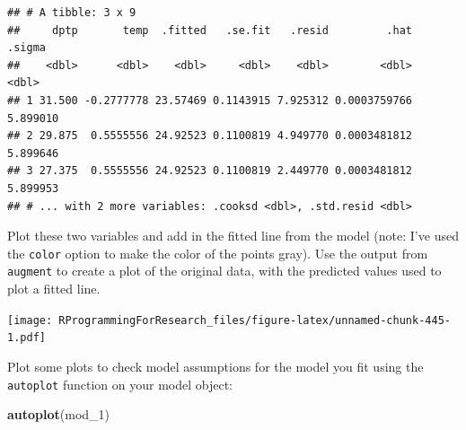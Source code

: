 \documentclass[]{book}
\makeatletter
\newenvironment{Shaded}{\begin{snugshade}}{\end{snugshade}}
\newcommand{\KeywordTok}[1]{\textcolor[rgb]{0.13,0.29,0.53}{\textbf{#1}}}
\newcommand{\DataTypeTok}[1]{\textcolor[rgb]{0.13,0.29,0.53}{#1}}
\newcommand{\DecValTok}[1]{\textcolor[rgb]{0.00,0.00,0.81}{#1}}
\newcommand{\FloatTok}[1]{\textcolor[rgb]{0.00,0.00,0.81}{#1}}
\newcommand{\StringTok}[1]{\textcolor[rgb]{0.31,0.60,0.02}{#1}}
\newcommand{\OperatorTok}[1]{\textcolor[rgb]{0.81,0.36,0.00}{\textbf{#1}}}
\newcommand{\NormalTok}[1]{#1}
\newenvironment{kframe}{%
\medskip{}
\setlength{\fboxsep}{.8em}
 \def\at@end@of@kframe{}%
 \ifinner\ifhmode%
  \def\at@end@of@kframe{\end{minipage}}%
  \begin{minipage}{\columnwidth}%
 \fi\fi%
 \def\FrameCommand##1{\hskip\@totalleftmargin \hskip-\fboxsep
 \colorbox{shadecolor}{##1}\hskip-\fboxsep
     \hskip-\linewidth \hskip-\@totalleftmargin \hskip\columnwidth}%
 \MakeFramed {\advance\hsize-\width
   \@totalleftmargin\z@ \linewidth\hsize
   \@setminipage}}%
 {\par\unskip\endMakeFramed%
 \at@end@of@kframe}
\renewenvironment{Shaded}{\begin{kframe}}{\end{kframe}}
\theoremstyle{definition}
\theoremstyle{definition}
\theoremstyle{definition}
\theoremstyle{remark}
\makeatother
\begin{document}
\begin{verbatim}
## # A tibble: 3 x 9
##     dptp       temp  .fitted   .se.fit   .resid         .hat   .sigma
##    <dbl>      <dbl>    <dbl>     <dbl>    <dbl>        <dbl>    <dbl>
## 1 31.500 -0.2777778 23.57469 0.1143915 7.925312 0.0003759766 5.899010
## 2 29.875  0.5555556 24.92523 0.1100819 4.949770 0.0003481812 5.899646
## 3 27.375  0.5555556 24.92523 0.1100819 2.449770 0.0003481812 5.899953
## # ... with 2 more variables: .cooksd <dbl>, .std.resid <dbl>
\end{verbatim}

Plot these two variables and add in the fitted line from the model
(note: I've used the \texttt{color} option to make the color of the
points gray). Use the output from \texttt{augment} to create a plot of
the original data, with the predicted values used to plot a fitted line.

\begin{Shaded}
\end{Shaded}

\texttt{[image: RProgrammingForResearch\_files/figure-latex/unnamed-chunk-445-1.pdf]}

Plot some plots to check model assumptions for the model you fit using
the \texttt{autoplot} function on your model object:

\begin{Shaded}
\begin{Highlighting}[]
\KeywordTok{autoplot}\NormalTok{(mod_}\DecValTok{1}\NormalTok{)}
\end{Highlighting}
\end{Shaded}
\end{document}
